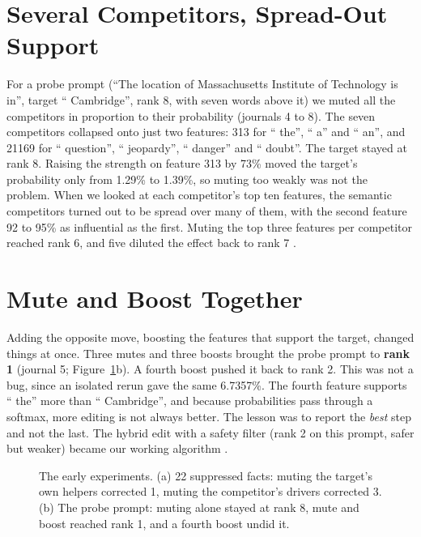 \section{Several Competitors, Spread-Out Support}\label{sec:several}

For a probe prompt (``The location of Massachusetts Institute of Technology is in'', target `` Cambridge'', rank 8, with seven words above it) we muted all the competitors in proportion to their probability (journals 4 to 8). The seven competitors collapsed onto just two features: 313 for `` the'', `` a'' and `` an'', and 21169 for `` question'', `` jeopardy'', `` danger'' and `` doubt''. The target stayed at rank 8. Raising the strength on feature 313 by 73\% moved the target's probability only from 1.29\% to 1.39\%, so muting too weakly was not the problem. When we looked at each competitor's top ten features, the semantic competitors turned out to be spread over many of them, with the second feature 92 to 95\% as influential as the first. Muting the top three features per competitor reached rank 6, and five diluted the effect back to rank 7 \cite{p3}.

\section{Mute and Boost Together}\label{sec:hybrid}

Adding the opposite move, boosting the features that support the target, changed things at once. Three mutes and three boosts brought the probe prompt to \textbf{rank 1} (journal 5; Figure~\ref{fig:early}b). A fourth boost pushed it back to rank 2. This was not a bug, since an isolated rerun gave the same 6.7357\%. The fourth feature supports `` the'' more than `` Cambridge'', and because probabilities pass through a softmax, more editing is not always better. The lesson was to report the \emph{best} step and not the last. The hybrid edit with a safety filter (rank 2 on this prompt, safer but weaker) became our working algorithm \cite{p3}.

\begin{figure}[!htb]
\centering
{}
\caption{The early experiments. (a) 22 suppressed facts: muting the target's own helpers corrected 1, muting the competitor's drivers corrected 3. (b) The probe prompt: muting alone stayed at rank 8, mute and boost reached rank 1, and a fourth boost undid it.}\label{fig:early}
\end{figure}


